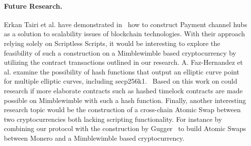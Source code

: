 \paragraph{Future Research.} Erkan Tairi et al. have demonstrated in~\cite{tairi2019a2l} how to construct Payment channel hubs as a solution to scalability issues of blockchain technologies.
With their approach relying solely on Scriptless Scripts, it would be interesting to explore the feasibility of such a construction on a Mimblewimble based cryptocurrency by utilizing the contract transactions outlined in our research.
A. Faz-Hernandez et al. examine the possibility of hash functions that output an elliptic curve point for multiple elliptic curves, including secp256k1.~\cite{hernandez2020hashing} Based on this work on could research if more elaborate contracts such as hashed timelock contracts are made possible on Mimblewimble with such a hash function.
Finally, another interesting research topic would be the construction of a cross-chain Atomic Swap between two cryptocurrencies both lacking scripting functionality.
For instance by combining our protocol with the construction by Gugger~\cite{gugger2020bitcoin} to build Atomic Swaps between Monero and a Mimblewimble based cryptocurrency.


